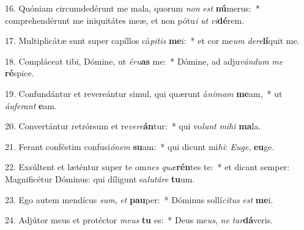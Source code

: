16. Quóniam circumdedérunt me mala, quorum \textit{non} \textit{est} \textbf{nú}merus:~*  comprehendérunt me iniquitátes meæ, et non pótu\textit{i} \textit{ut} \textit{vi}\textbf{dé}rem.\

17. Multiplicátæ sunt super capíllos cá\textit{pi}\textit{tis} \textbf{me}i:~*  et cor me\textit{um} \textit{de}\textit{re}\textbf{lí}quit me.\

18. Compláceat tibi, Dómine, ut \textit{é}\textit{ru}\textbf{as} me:~*  Dómine, ad adju\textit{ván}\textit{dum} \textit{me} \textbf{ré}spice.\

19. Confundántur et revereántur simul, qui quærunt á\textit{ni}\textit{mam} \textbf{me}am,~*  ut \textit{áu}\textit{fe}\textit{rant} \textbf{e}am.\

20. Convertántur retrórsum et re\textit{ve}\textit{re}\textbf{án}tur:~*  qui vo\textit{lunt} \textit{mi}\textit{hi} \textbf{ma}la.\

21. Ferant conféstim confusi\textit{ó}\textit{nem} \textbf{su}am:~*  qui dicunt mi\textit{hi}: \textit{Eu}\textit{ge}, \textbf{eu}ge.\

22. Exsúltent et læténtur super te om\textit{nes} \textit{quæ}\textbf{rén}tes te:~*  et dicant semper: Magnificétur Dóminus: qui díligunt sa\textit{lu}\textit{tá}\textit{re} \textbf{tu}um.\

23. Ego autem mendícus \textit{sum}, \textit{et} \textbf{pau}per:~*  Dóminus sollí\textit{ci}\textit{tus} \textit{est} \textbf{me}i.\

24. Adjútor meus et protéctor \textit{me}\textit{us} \textbf{tu} es:~*  Deus me\textit{us}, \textit{ne} \textit{tar}\textbf{dá}veris.\


